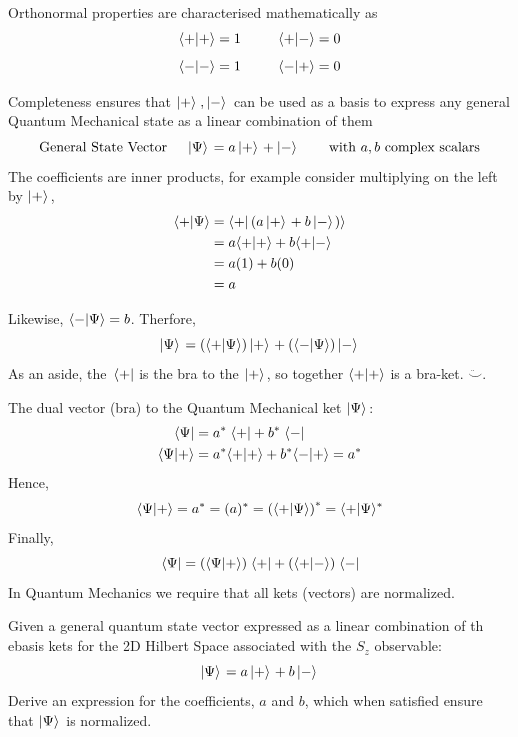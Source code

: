 \documentclass[english, 11pt]{article}
\begin{document}
         Orthonormal properties are characterised mathematically as
         \[ \langle + | + \rangle = 1 \ \ \ \ \ \ \ \ \langle + | - \rangle = 0 \]
         \[ \braket{-}{-} = 1 \ \ \ \ \ \ \ \ \braket{-}{+} = 0 \]

         Completeness ensures that $\left| + \rangle \right., \left| - \rangle \right.$ can be used as a basis to express any general Quantum Mechanical state as a linear combination of them
         \[ \mbox{General State Vector \ \ \ } \left| \Psi \rangle \right. = a\left| + \rangle \right. + \left| - \rangle \right. \mbox{ \ \ \ \ \ with $a, b$ complex scalars}  \]
         The coefficients are inner products, for example consider multiplying on the left by $\left| + \rangle \right.$,
         \begin{align*}
           \langle + | \Psi \rangle & = \langle + | \left( a\left| + \rangle \right.+b\left| - \rangle \right. \right) \rangle \\
                            & = a\langle + | + \rangle + b\langle + | - \rangle \\
                            & = a(1) + b(0) \\
                            & = a
         \end{align*}

         Likewise, $\langle - | \Psi \rangle = b$. Therfore,
         \[ \left| \Psi \rangle \right. = \left( \langle + | \Psi \rangle \right)\left| + \rangle \right. + \left( \langle - | \Psi \rangle \right) \left| - \rangle \right. \]
          As an aside, the $\left. \langle + \right|$ is the bra to the $\left| + \rangle \right.$, so together $\langle + | + \rangle$ is a bra-ket. $\ddot\smile$.
          \newline

          The dual vector (bra) to the Quantum Mechanical ket $\left| \Psi \rangle \right.$:
          \begin{align*}
            \left. \langle \Psi \right| & = a^*\left. \langle + \right| + b^*\left. \langle - \right| \\
            \langle \Psi | + \rangle & = a^*\langle + | + \rangle + b^*\langle - | + \rangle = a^*
          \end{align*}
          Hence,
          \[ \langle \Psi | + \rangle = a^* = (a)^* = \left( \langle + | \Psi \rangle \right)^* = \langle + | \Psi \rangle^* \]
          Finally,
          \[ \left. \langle \Psi \right| = \left( \langle \Psi | + \rangle \right) \left. \langle + \right| + \left( \langle + | - \rangle \right)\left. \langle - \right| \]
          In Quantum Mechanics we require that all kets (vectors) are normalized.

          \begin{exmp}
            Given a general quantum state vector expressed as a linear combination of th ebasis kets for the 2D Hilbert Space associated with the $S_z$ observable:
            \[ \left| \Psi \rangle \right. = a \left| + \rangle \right. + b\left| - \rangle \right. \]
            Derive an expression for the coefficients, $a$ and $b$, which when satisfied ensure that $\left| \Psi \rangle \right.$ is normalized.
          \end{exmp}
\end{document}
